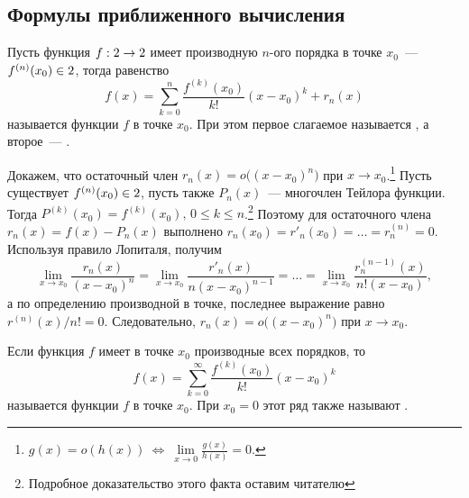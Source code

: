 \subsection{Формулы приближенного вычисления}
Пусть функция $f: 2 \rightarrow 2$ имеет производную $n$-ого порядка в точке $x_0$~--- $f^{(n)}(x_0) \in 2$, тогда равенство
\begin{equation}
    f(x) = \sum\limits_{k=0}^{n} \frac{f^{(k)}(x_0)}{k!} (x - x_0)^k + r_n(x)
    \label{eq:taylor-formula}
\end{equation}
называется  функции $f$ в точке $x_0$. При этом первое слагаемое называется , а второе~--- .

Докажем, что остаточный член $r_n(x) = o\big( (x - x_0)^n \big)$ при $x \rightarrow x_0$.\footnote{$g(x) = o(h(x)) ~ \Leftrightarrow ~ \lim\limits_{x \rightarrow 0} \frac{g(x)}{h(x)} = 0$.} Пусть существует $f^{(n)} (x_0) \in 2$, пусть также $P_n(x)$~--- многочлен Тейлора функции. Тогда $P^{(k)}(x_0) = f^{(k)}(x_0), \, 0 \leqslant k \leqslant n$.\footnote{Подробное доказательство этого факта оставим читателю} Поэтому для остаточного члена $r_n(x) = f(x) - P_n(x)$ выполнено $r_n(x_0) = r'_n(x_0) = \ldots = r_n^{(n)} = 0$. Используя правило Лопиталя, получим
\begin{equation*}
    \lim_{x \rightarrow x_0} \frac{r_n(x)}{(x - x_0)^n}
        = \lim_{x \rightarrow x_0} \frac{r'_n(x)}{n (x - x_0)^{n-1}}
        = \ldots
        = \lim_{x \rightarrow x_0} \frac{r^{(n-1)}_n(x)}{n!(x - x_0)},
\end{equation*}
а по определению производной в точке, последнее выражение равно $r^{(n)}(x) / n! = 0$. Следовательно, $r_n(x) = o\big( (x - x_0)^n \big)$ при $x \rightarrow x_0$.

Если функция $f$ имеет в точке $x_0$ производные всех порядков, то
\begin{equation}
    f(x) = \sum\limits_{k=0}^{\infty} \frac{f^{(k)}(x_0)}{k!} (x - x_0)^k
    \label{eq:taylor-series}
\end{equation}
называется  функции $f$ в точке $x_0$. При $x_0 = 0$ этот ряд также называют .

